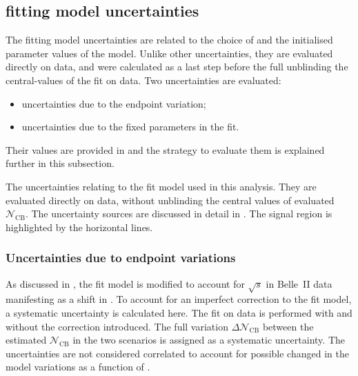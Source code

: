 \subsection{\texorpdfstring{\Mbc}{Mbc} fitting model uncertainties}\label{sec:fit_uncertainties}

The \Mbc fitting model uncertainties are related to the choice of  
and the initialised parameter values of the model.
Unlike other uncertainties, they are evaluated directly on data, and were calculated as a last step
before the full unblinding the central-values of the \Mbc fit on data.
Two uncertainties are evaluated:
\begin{itemize}
    \item uncertainties due to the \Mbc endpoint variation;
    \item uncertainties due to the fixed parameters in the \Mbc fit.
\end{itemize}
Their values are provided in  and the strategy to evaluate them is explained further in this subsection.

\begin{table}[htbp!]
    \centering
    \caption{\label{tab:fit_uncertainties} 
    The uncertainties relating to the \Mbc fit model used in this analysis.
    They are evaluated directly on data, without unblinding the central values of evaluated $\mathcal{N}_{\mathrm{CB}}$.
    The uncertainty sources are discussed in detail in .
    The signal region is highlighted by the horizontal lines.
    }
    
\end{table}

\subsubsection{Uncertainties due to \texorpdfstring{\Mbc}{Mbc} endpoint variations}\label{sec:fit_endpoint_systematic}

As discussed in , the fit model is modified to account for $\sqrt{s}$ in Belle~II data manifesting as a shift in \Mbc.
To account for an imperfect correction to the fit model, a systematic uncertainty is calculated here.
The fit on data is performed with and without the \Mbc correction introduced.
The full variation $\Delta\mathcal{N}_{\mathrm{CB}}$ between the estimated $\mathcal{N}_{\mathrm{CB}}$ in the two scenarios is assigned as a systematic uncertainty.
The uncertainties are not considered correlated to account for possible changed in the model variations as a function of \EB.

